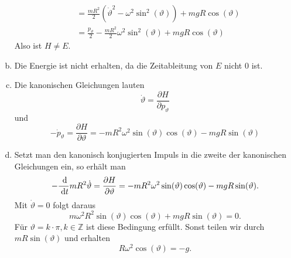 \documentclass{article}
\theoremstyle{definition}
\newcommand{\Z}{\mathbb{Z}}
\renewcommand{\theta}{\vartheta}
\begin{document}
\begin{enumerate}[(a)]
\begin{align*}
        &= \frac{mR^2}{2} \left(\dot \theta^2 - \omega^2 \sin^2(\theta)\right) + mgR\cos(\theta)\\
        &= \frac{p_\theta}{2} - \frac{mR^2}{2} \omega^2 \sin^2(\theta) + mgR\cos(\theta)
    \end{align*}
    Also ist $H\neq E$.
    \item Die Energie ist nicht erhalten, da die Zeitableitung von $E$ nicht 0 ist.
    \item Die kanonischen Gleichungen lauten
    $$\dot \theta = \frac{\partial H}{\partial p_\theta}$$ und $$-\dot p_\theta = \frac{\partial H}{\partial \theta} = -mR^2\omega^2\sin(\theta)\cos(\theta) - mgR \sin(\theta)$$
    \item Setzt man den kanonisch konjugierten Impuls in die zweite der kanonischen Gleichungen ein, so erhält man
    $$- \frac{\d}{\d t}mR^2 \dot \theta = \frac{\partial H}{\partial \theta} = - mR^2\omega^2\sin(\theta)\cos(\theta) - mgR \sin(\theta).$$ Mit $\dot \theta = 0$ folgt daraus
    $$m\omega^2R^2\sin(\theta)\cos(\theta) + mgR \sin(\theta) = 0.$$
    Für $\theta = k\cdot \pi, k \in \Z$ ist diese Bedingung erfüllt. Sonst teilen wir durch $mR\sin(\theta)$ und erhalten
    $$R\omega^2\cos(\theta) = -g.$$
\end{enumerate}
\end{document}
